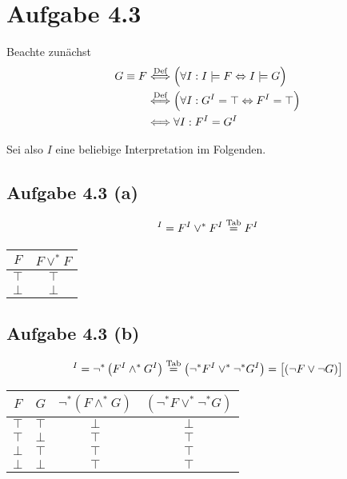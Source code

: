 \documentclass[12pt,a4paper]{article}
\begin{document}

\section*{Aufgabe 4.3}
Beachte zunächst
\begin{align*}
G\equiv F &\stackrel{\text{Def}}{\Longleftrightarrow}
\Big(\forall I:I\models F\Leftrightarrow I\models G\Big)\\
&\stackrel{\text{Def}}{\Longleftrightarrow}\Big(\forall I:G^I=\top\Leftrightarrow F^I=\top\Big)\\
&\Longleftrightarrow\forall I:F^I=G^I
\end{align*}

Sei also $I$ eine beliebige Interpretation im Folgenden.

\subsection*{Aufgabe 4.3 (a)}
\begin{align*}
[(F\vee F)]^I=F^I\vee^\ast F^I\stackeq{\text{Tab}} F^I
\end{align*}
\begin{tabular}{c||c}
$F$ & $F\vee^\ast F$\\ \hline
$\top$ & $\top$\\%
$\bot$ & $\bot$ %
\end{tabular}

\subsection*{Aufgabe 4.3 (b)}
\begin{align*}
[\neg(F\wedge G)]^I=\neg^\ast\left(F^I\wedge^\ast G^I\right)\stackeq{\text{Tab}}
\left(\neg^\ast F^I\vee^\ast\neg^\ast G^I\right)=\big[(\neg F\vee\neg G)\big]
\end{align*}
\begin{tabular}{c|c||c|c}
$F$ & $G$ & $\neg^\ast(F\wedge^\ast G)$ & $(\neg^\ast F\vee^\ast\neg^\ast G)$\\ \hline
$\top$ & $\top$ & $\bot$ & $\bot$\\
$\top$ & $\bot$ & $\top$ & $\top$\\
$\bot$ & $\top$ & $\top$ & $\top$\\
$\bot$ & $\bot$ & $\top$ & $\top$
\end{tabular}
\end{document}
